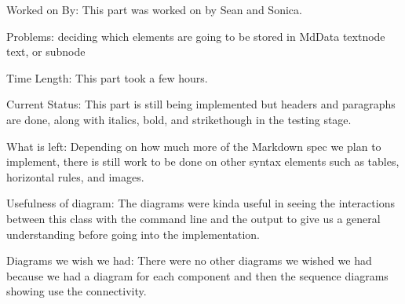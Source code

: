 \noindent Worked on By: This part was worked on by Sean and Sonica. \newline

\noindent Problems: deciding which elements are going to be stored in MdData textnode text, or subnode \newline

\noindent Time Length: This part took a few hours. \newline

\noindent Current Status: This part is still being implemented but headers and paragraphs are done, along with italics, bold, and strikethough in the testing stage. \newline

\noindent What is left: Depending on how much more of the Markdown spec we plan to implement, there is still work to be done on other syntax elements such as tables, horizontal rules, and images. \newline

\noindent Usefulness of diagram: The diagrams were kinda useful in seeing the interactions between this class with the command line and the output to give us a general understanding before going into the implementation. \newline

\noindent Diagrams we wish we had: There were no other diagrams we wished we had because we had a diagram for each component and then the sequence diagrams showing use the connectivity. 
